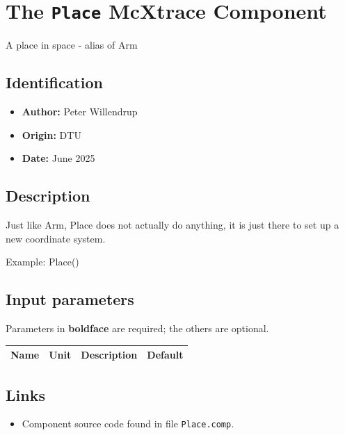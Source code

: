 \section{The \texttt{Place} McXtrace Component}
A place in space - alias of Arm

\subsection*{Identification}
\begin{itemize}
  \item \textbf{Author:} Peter Willendrup
  \item \textbf{Origin:} DTU
  \item \textbf{Date:} June 2025
\end{itemize}

\subsection*{Description}
Just like Arm, Place does not actually do anything, it is just there to set up a new coordinate system.

Example: Place()

\subsection*{Input parameters}
Parameters in \textbf{boldface} are required; the others are optional.

\begin{longtable}{p{}p{}p{}p{}}
\toprule
\textbf{Name} & \textbf{Unit} & \textbf{Description} & \textbf{Default} \\
\midrule
\endhead
\bottomrule
\end{longtable}

\subsection*{Links}
\begin{itemize}
  \item Component source code found in file \texttt{Place.comp}.
\end{itemize}
